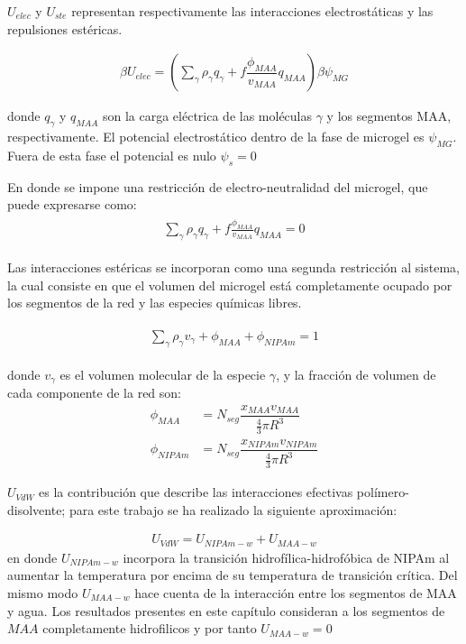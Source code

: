$U_{elec}$ y $U_{ste}$ representan respectivamente las interacciones electrost\'aticas y las repulsiones est\'ericas.

\begin{align}
	  \beta U_{elec} =\left(\sum_{\gamma } {\rho_\gamma q_\gamma + f\dfrac{\phi_{MAA}}{v_{MAA}}q_{MAA}}\right)\beta\psi_{MG}
\end{align}

\noindent donde $q_\gamma$ y $q_{MAA}$ son la carga el\'ectrica de las moléculas $\gamma$ y los segmentos MAA, respectivamente.
El potencial electrost\'atico dentro de la fase de microgel es $\psi_{MG}$. Fuera de esta fase el potencial es nulo $\psi_s = 0$

En donde se impone una restricci\'on de electro-neutralidad del microgel, que puede expresarse como:
%
%
\begin{align}
	\begin{aligned}
		\sum_{\gamma  } \rho_\gamma q_\gamma + f\frac{\phi_{MAA}}{v_{MAA}}q_{MAA}=0
	\end{aligned}
	\label{eq:gel:charge-neutrality}
\end{align}

Las interacciones est\'ericas se incorporan como una segunda restricci\'on al sistema, la cual consiste en que  el volumen del microgel est\'a completamente ocupado por los segmentos de la red y las especies qu\'imicas libres.

%
\begin{align}
	\begin{aligned}
		\sum_{\gamma } \rho_\gamma v_\gamma  + \phi_{MAA} + \phi_{NIPAm} = 1
	\end{aligned}
	\label{eq:gel:packing}
\end{align}



\noindent donde $v_\gamma$  es el volumen molecular de la especie $\gamma$, y la fracci\'on de volumen de cada componente de la red son: 
%
%
\begin{align}
	\phi_{MAA}&=N_{seg}\dfrac{x_{MAA}v_{MAA}}{\frac{4}{3}\pi R^3}\\
	\phi_{NIPAm}&=N_{seg}\dfrac{x_{NIPAm}v_{NIPAm}}{\frac{4}{3}\pi R^3}
\end{align}



$U_{VdW}$ es la contribuci\'on que describe las interacciones efectivas pol\'imero-disolvente; para este trabajo  se ha realizado la siguiente aproximaci\'on: 

\begin{align}
	U_{VdW} = U_{NIPAm-w} + U_{MAA-w}
\end{align}
\noindent en donde $U_{NIPAm-w}$ incorpora la transici\'on hidrofílica-hidrof\'obica de NIPAm al aumentar la temperatura por encima de su temperatura de transici\'on cr\'itica. 
Del mismo modo $U_{MAA-w}$ hace cuenta de la interacci\'on entre los segmentos de MAA y agua.
Los resultados presentes en este cap\'itulo consideran a los segmentos de $MAA$ completamente hidrofilicos y por tanto $U_{MAA-w} = 0$

